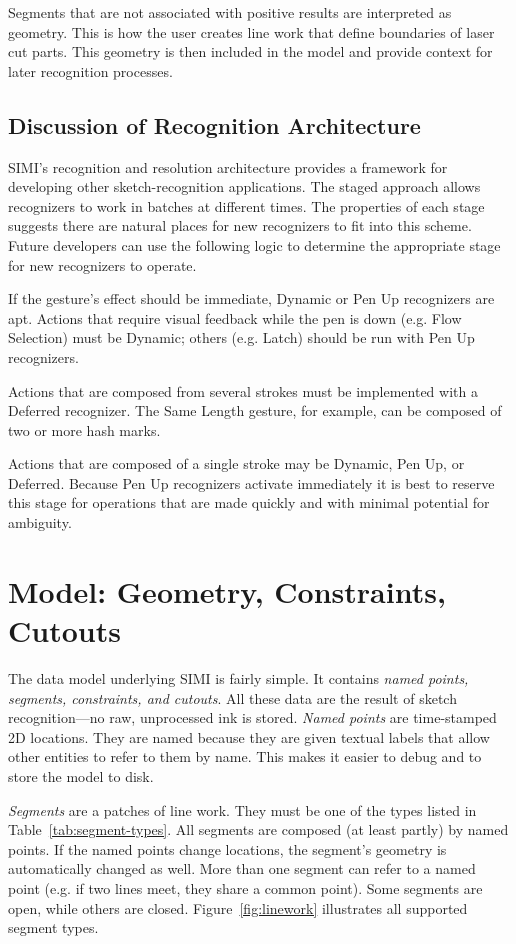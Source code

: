 Segments that are not associated with positive results are interpreted
as geometry. This is how the user creates line work that define
boundaries of laser cut parts. This geometry is then included in the
model and provide context for later recognition processes.

\subsection{Discussion of Recognition Architecture}

SIMI's recognition and resolution architecture provides a framework
for developing other sketch-recognition applications. The staged
approach allows recognizers to work in batches at different times. The
properties of each stage suggests there are natural places for new
recognizers to fit into this scheme. Future developers can use the
following logic to determine the appropriate stage for new recognizers
to operate.

If the gesture's effect should be immediate, Dynamic or Pen Up
recognizers are apt. Actions that require visual feedback while the
pen is down (e.g. Flow Selection) must be Dynamic; others (e.g. Latch)
should be run with Pen Up recognizers.

Actions that are composed from several strokes must be implemented
with a Deferred recognizer. The Same Length gesture, for example, can
be composed of two or more hash marks.

Actions that are composed of a single stroke may be Dynamic, Pen Up,
or Deferred. Because Pen Up recognizers activate immediately it is
best to reserve this stage for operations that are made quickly and
with minimal potential for ambiguity. 

\section{Model: Geometry, Constraints, Cutouts}

The data model underlying SIMI is fairly simple. It contains
\textit{named points, segments, constraints, and cutouts}. All these
data are the result of sketch recognition---no raw, unprocessed ink is
stored. \textit{Named points} are time-stamped 2D locations. They are
named because they are given textual labels that allow other entities
to refer to them by name. This makes it easier to debug and to store
the model to disk. 

\textit{Segments} are a patches of line work. They must be one of the
types listed in Table~\ref{tab:segment-types}. All segments are
composed (at least partly) by named points. If the named points change
locations, the segment's geometry is automatically changed as
well. More than one segment can refer to a named point (e.g. if two
lines meet, they share a common point). Some segments are open, while
others are closed. Figure~\ref{fig:linework} illustrates all supported
segment types.


